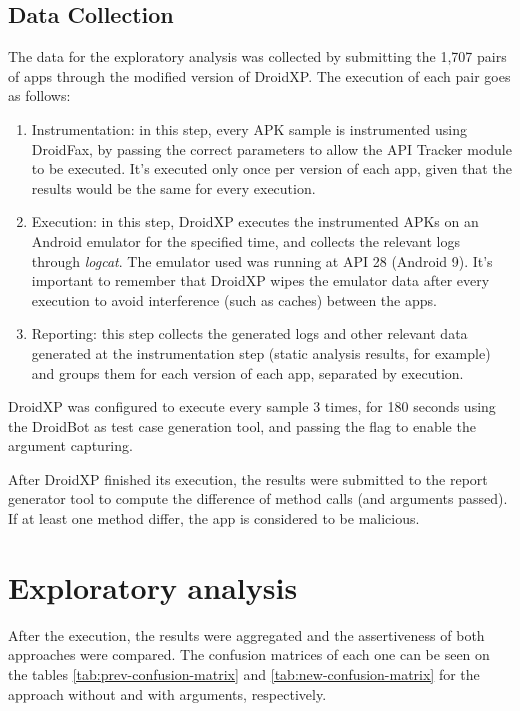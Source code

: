 \subsection{Data Collection}

The data for the exploratory analysis was collected by submitting the 1,707 pairs of apps through the modified version of DroidXP. The execution of each pair goes as follows:

\begin{enumerate}
    \item Instrumentation: in this step, every APK sample is instrumented using DroidFax, by passing the correct parameters to allow the API Tracker module to be executed. It's executed only once per version of each app, given that the results would be the same for every execution.
    \item Execution: in this step, DroidXP executes the instrumented APKs on an Android emulator for the specified time, and collects the relevant logs through \textit{logcat}. The emulator used was running at API 28 (Android 9). It's important to remember that DroidXP wipes the emulator data after every execution to avoid interference (such as caches) between the apps.
    \item Reporting: this step collects the generated logs and other relevant data generated at the instrumentation step (static analysis results, for example) and groups them for each version of each app, separated by execution.
\end{enumerate}

DroidXP was configured to execute every sample 3 times, for 180 seconds using the DroidBot as test case generation tool, and passing the  flag to enable the argument capturing.

After DroidXP finished its execution, the results were submitted to the report generator tool to compute the difference of method calls (and arguments passed). If at least one method differ, the app is considered to be malicious.

\section{Exploratory analysis}

After the execution, the results were aggregated and the assertiveness of both approaches were compared. The confusion matrices of each one can be seen on the tables \ref{tab:prev-confusion-matrix} and \ref{tab:new-confusion-matrix} for the approach without and with arguments, respectively.

